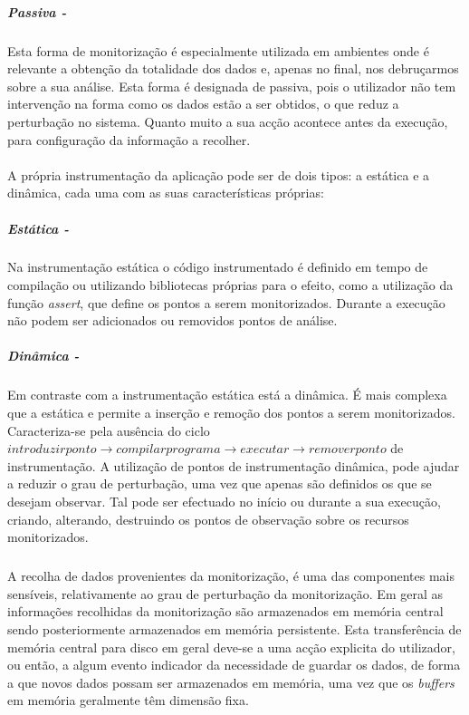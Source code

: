 \subparagraph*{Passiva - }
Esta forma de monitorização é especialmente utilizada em ambientes onde é relevante a obtenção da totalidade dos dados e, apenas no final, nos debruçarmos sobre a sua análise.
Esta forma é designada de passiva, pois o utilizador não tem intervenção na forma como os dados estão a ser obtidos, o que reduz a perturbação no sistema.
Quanto muito a sua acção acontece antes da execução, para configuração da informação a recolher.

\paragraph*{}
A própria instrumentação da aplicação pode ser de dois tipos: a estática e a dinâmica, cada uma com as suas características próprias:

\subparagraph*{Estática - }

Na instrumentação estática o código instrumentado é definido em tempo de compilação ou utilizando bibliotecas próprias para o efeito, como a utilização da função \textit{assert}, que define os pontos a serem monitorizados.
Durante a execução não podem ser adicionados ou removidos pontos de análise.

\subparagraph*{Dinâmica - }

Em contraste com a instrumentação estática está a dinâmica.
É mais complexa que a estática e permite a inserção e remoção dos pontos a serem monitorizados.
Caracteriza-se pela ausência do ciclo $introduzir ponto\rightarrow compilar programa\rightarrow executar\rightarrow remover ponto$ de instrumentação.
A utilização de pontos de instrumentação dinâmica, pode ajudar a reduzir o grau de perturbação, uma vez que apenas são definidos os que se desejam observar.
Tal pode ser efectuado no início ou durante a sua execução, criando, alterando, destruindo os pontos de observação sobre os recursos monitorizados.


\subparagraph*{
}
A recolha de dados provenientes da monitorização, é uma das componentes mais sensíveis, relativamente ao grau de perturbação da monitorização.
Em geral as informações recolhidas da monitorização são armazenados em memória central sendo posteriormente armazenados em memória persistente.
Esta transferência de memória central para disco em geral deve-se a uma acção explicita do utilizador, ou então, a algum evento indicador da necessidade de guardar os dados, de forma a que novos dados possam ser armazenados em memória, uma vez que os \textit{buffers} em memória geralmente têm dimensão fixa.

